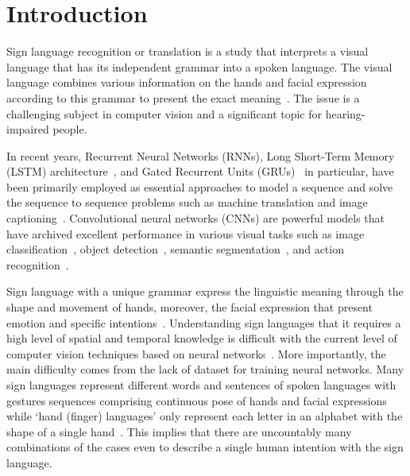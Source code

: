 \documentclass[10pt,twocolumn,letterpaper]{article}
\begin{document}
\section{Introduction}
Sign language recognition or translation is a study that interprets a visual language that has its independent grammar into a spoken language. The visual language combines various information on the hands and facial expression according to this grammar to present the exact meaning~\cite{ForsterSHKZPN12,von2008significance}. The issue is a challenging subject in computer vision and a significant topic for hearing-impaired people.

In recent years, Recurrent Neural Networks (RNNs), Long Short-Term Memory (LSTM) architecture~\cite{HochreiterS97}, and  Gated Recurrent Units (GRUs)~\cite{ChovGBBSB14} in particular, have been primarily employed as essential approaches to model a sequence and solve the sequence to sequence problems such as machine translation and image captioning~\cite{dai2017contrastive,liu2017attention,SutskeverVL14,xu2015show}. Convolutional neural networks (CNNs) are powerful models that have archived excellent performance in various visual tasks such as image classification~\cite{husqueeze,huang2017densely}, object detection~\cite{gao2017dynamic,redmon2016you}, semantic segmentation~\cite{long2015fully,zhang2018context}, and action recognition~\cite{donahue2015long,luvizon20182d}.  

Sign language with a unique grammar express the linguistic meaning through the shape and movement of hands, moreover, the facial expression that present emotion and specific intentions~\cite{von2008significance}. Understanding sign languages that it requires a high level of spatial and temporal knowledge is difficult with the current level of computer vision techniques based on neural networks~\cite{DongLY15,ForsterSHKZPN12,gattupalli2016evaluation,KishoreSK14,KollerFN15,koller2017re,StarnerP95}. 
More importantly, the main difficulty comes from the lack of dataset for training neural networks. Many sign languages represent different words and sentences of spoken languages with gestures sequences comprising continuous pose of hands and facial expressions while `hand (finger) languages' only represent each letter in an alphabet with the shape of a single hand~\cite{CamgozHKNB18}. This implies that there are uncountably many combinations of the cases even to describe a single human intention with the sign language. 
\end{document}
